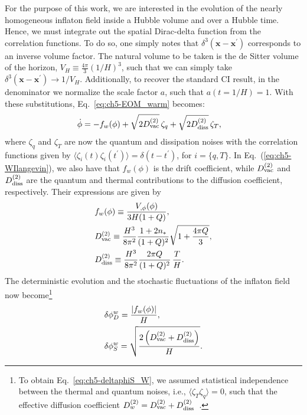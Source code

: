 For the purpose of this work, we are interested in the evolution of the nearly homogeneous
inflaton field inside a Hubble volume and over a Hubble time. Hence, we must integrate out the
spatial Dirac-delta function from the correlation functions. To do so,
one simply notes that $\delta^{3}(\mathbf{x}-\mathbf{x^\prime})$
corresponds to an inverse volume factor. The natural volume to be
taken is the de Sitter volume of the horizon, $V_H\equiv
\frac{4\pi}{3}\left(1/H\right)^3$, such that we can simply take
$\delta^{3}(\mathbf{x}-\mathbf{x^\prime})\rightarrow
1/V_H$. Additionally, to recover the standard CI result,
in the denominator we normalize the scale factor $a$, such that $a(t=1/H)=1$.  With these substitutions, Eq.~\ref{eq:ch5-EOM_warm} becomes:
%
\begin{align}
    \dot{\phi}&=-f_w(\phi)+\sqrt{2D^{(2)}_{\rm{vac}}}\,\zeta_q
    +\sqrt{2D^{(2)}_{\rm{diss}}}\,\zeta_T,
\label{eq:ch5-WIlangevin}
\end{align}
%
where $\zeta_q$ and $\zeta_T$ are now the quantum and dissipation
noises with the correlation functions  given by $\langle
\zeta_i(t)\zeta_i(t^\prime)\rangle= \delta(t-t^\prime)$, for $i=\{ q,
T\}$.  In Eq.~(\ref{eq:ch5-WIlangevin}), we also have that $f_w(\phi)$ is the
drift coefficient, while $D^{(2)}_{\rm{vac}}$ and
$D^{(2)}_{\rm{diss}}$ are the quantum and thermal contributions to the
diffusion coefficient, respectively.  Their expressions are given by
%
\begin{align}
  &f_w(\phi)\equiv\frac{V_{,\phi}(\phi)}{3H(1+Q)}, \label{eq:ch5-driftC_warm}
  \\
  &D^{(2)}_{\rm{vac}}\equiv\frac{H^{3}}{8\pi^2}\frac{1+2n_*}{(1+Q)^2}
  \sqrt{1+\frac{4\pi
      Q}{3}},
\label{eq:ch5-diffusionC_warmq}
\\ & D^{(2)}_{\rm{diss}}\equiv \frac{H^{3}}{8\pi^2} \frac{2\pi
  Q}{(1+Q)^2} \,\frac{T}{H}. \label{eq:ch5-diffusionC_warmT}
\end{align}
%
The deterministic evolution and the stochastic fluctuations of the
inflaton field now become\footnote{To obtain
Eq.~\ref{eq:ch5-deltaphiS_W}, we assumed statistical independence
between the thermal and quantum noises, i.e.,
$\langle\zeta_T\zeta_q\rangle=0$, such that the effective diffusion
coefficient
$D^{(2)}_w=D^{(2)}_{\rm{vac}}+D^{(2)}_{\rm{diss}}$~\cite{Ramos:2013nsa}.}
%
\begin{align}
  &\delta\phi^{w}_D=\frac{|f_w(\phi)|}{H},\label{eq:ch5-deltaphiD_W}
  \\
  &\delta\phi^{w}_S=\sqrt{\frac{2\left(D^{(2)}_{\rm{vac}}+D^{(2)}_{\rm{diss}}
      \right)}{H}}. \label{eq:ch5-deltaphiS_W}
\end{align}


